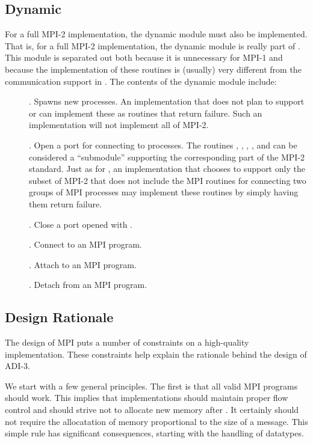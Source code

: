 \documentclass{article}
\begin{document}
\subsection{Dynamic}
For a full MPI-2 implementation, the dynamic module must also be
implemented.  That is, for a full MPI-2 implementation, the dynamic
module is really part of .  This module is separated
out both because it is unnecessary for MPI-1 and because the
implementation of these routines is (usually) very different from the
communication support in .  The contents of the
dynamic module include:

\begin{description}
\item[]. Spawns new processes.  An
implementation 
  that does not plan to support  or
   can implement these as routines that return
  failure.  Such an implementation will not implement all of MPI-2.
\item[]. Open a port for connecting to processes.  The
  routines , ,
  , , and
   can be considered a 
  ``submodule'' supporting the corresponding part of the MPI-2 standard.  Just
  as for , an implementation that chooses to
  support only the subset of MPI-2 that does not include the MPI routines for
  connecting two groups of MPI processes may implement these routines by
  simply having them return failure.
\item[]. Close a port opened with .
\item[]. Connect to an MPI program.
\item[]. Attach to an MPI program.
\item[]. Detach from an MPI program.
\end{description}

\subsection{Design Rationale}
\label{sec-intermediate}
The design of MPI puts a number of constraints on a high-quality
implementation.  These constraints help explain the rationale behind
the design of ADI-3.

We start with a few general principles.  The first is that all valid
MPI programs should work.  This implies that implementations should
maintain proper flow control and should strive not to allocate new
memory after .  It certainly should not require
the allocatation of memory proportional to the size of a message.
This simple rule has significant consequences, starting with the
handling of datatypes.
\end{document}
